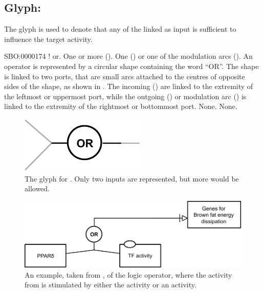 \subsection{Glyph: }
\label{sec:af:or}

The glyph  is used to denote that any of the  linked as input is sufficient to influence the target activity.

\begin{glyphDescription}
 \glyphSboTerm SBO:0000174 ! or.
 \glyphIncoming One or more  ().
 \glyphOutgoing  One  () or one of the modulation arcs ().
 \glyphContainer An  operator is represented by a circular shape containing the word ``OR''.
The shape is linked to two ports, that are small arcs attached to the centres of opposite sides of the shape, as shown in .
The incoming  () are linked to the extremity of the leftmost or uppermost port, while the outgoing  () or modulation arc () is linked to the extremity of the rightmost or bottommost port.
 \glyphLabel None.
 \glyphAux None.
 \end{glyphDescription}

\begin{figure}[H]
  \centering
  \includegraphics[scale = 1]{images/build/or.pdf}
  \caption{The \AF glyph for . Only two inputs are represented, but more would be allowed.}
  \label{fig:af:or}
\end{figure}


\begin{figure}[H]
  \centering
  \includegraphics[scale = 0.8]{src/images/build/or_example.pdf}
  \caption{An example, taken from , of the  logic operator, where the activity from  is stimulated by either the  activity or an  activity.}
  \label{fig:af:ex-or}
\end{figure}
